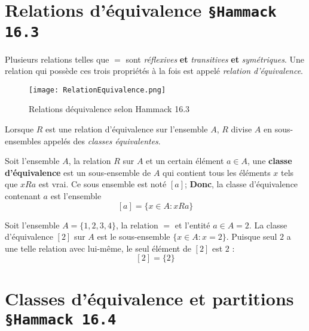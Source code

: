 \documentclass[16pt]{report}
\begin{document}
\begin{multicols*}{2}
    \section{Relations d'équivalence \texttt{\small{\S Hammack 16.3}}}
            
        
            
            Plusieurs relations telles que $=$ sont \textit{réflexives} \textbf{et} \textit{transitives} 
            \textbf{et} \textit{symétriques}. Une relation qui possède ces trois propriétés à la fois est 
            appelé \textit{relation d'équivalence}.   


            \begin{figure}[H]
                \begin{center}
                    \texttt{[image: RelationEquivalence.png]}
                \end{center}
                \caption{Relations déquivalence selon Hammack 16.3}
            \end{figure}
            \pagebreak

            Lorsque $R$ est une relation d'équivalence sur l'ensemble $A$, $R$ divise $A$ 
            en sous-ensembles appelés des \textit{classes équivalentes}.

            \begin{Definitionx}{}{}
                Soit l'ensemble $A$, la relation $R$ sur $A$ et un certain élément $a \in A$, une 
                \textbf{classe d'équivalence} est un sous-ensemble de $A$ qui contient tous 
                les éléments $x$ tels que $xRa$ est vrai. Ce sous ensemble est noté $[a]$; 
                \textbf{Donc}, la classe d'équivalence contenant $a$ est l'ensemble 
                        \[ [a] = \{ x \in A: xRa \}\]
            \end{Definitionx}


            \begin{EExample}{}{}
                Soit l'ensemble $A = \{ 1, 2, 3, 4\}$, la relation $=$ et l'entité $a \in A = 2$. La classe 
                d'équivalence $[2]$ sur $A$ est le sous-ensemble $\{ x \in A : x = 2 \}$. 
                Puisque seul $2$ a une telle relation avec lui-même, le seul élément de $[2]$ est $2$ :
                                        \[ [2] = \{2\}\]
            \end{EExample}      


            \section{Classes d'équivalence et partitions \texttt{\small{\S Hammack 16.4}}}
                

\end{multicols*}
\end{document}
